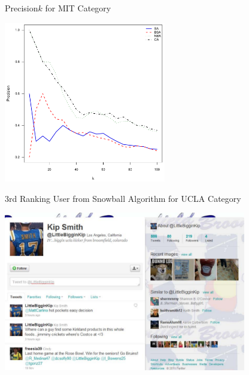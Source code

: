 \documentclass{beamer}
\begin{document}
\begin{frame}{Precision\at$k$ for MIT Category}
\begin{center}
  \includegraphics[width=200pt]{experiment/e1_mit.pdf}
\end{center}
\end{frame}

\begin{frame}{3rd Ranking User from Snowball Algorithm for UCLA Category}
\begin{center}
  \includegraphics[width=300pt]{experiment/example1.pdf}
\end{center}
\end{frame}
\end{document}
